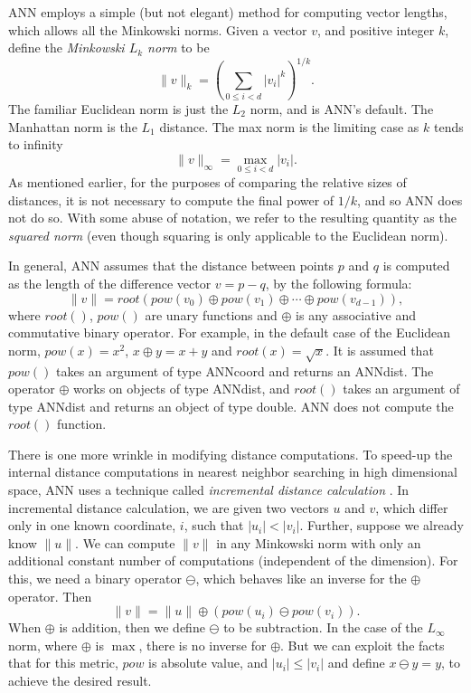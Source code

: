 \documentclass[11pt]{article}		%
\newcommand{\ANN}[0]{\textsf{ANN}}
\newcommand{\ROOT}[0]{\textit{root}}
\newcommand{\POW}[0]{\textit{pow}}
\newcommand{\DIFF}[0]{\ominus}
\newcommand{\SUM}[0]{\oplus}
\begin{document}
{\ANN} employs a simple (but not elegant) method for computing vector
lengths, which allows all the Minkowski norms.  Given a vector $v$, and
positive integer $k$, define the \emph{Minkowski $L_k$ norm} to be
\[
	\|v\|_k = \left( \sum_{0 \le i < d} |v_i|^k \right)^{1/k}.
\]
The familiar Euclidean norm is just the $L_2$ norm, and is {\ANN}'s
default.  The Manhattan norm is the $L_1$ distance.  The max norm is the
limiting case as $k$ tends to infinity
\[
	\|v\|_{\infty} = \max_{0 \le i < d} | v_i |.
\]
As mentioned earlier, for the purposes of comparing the relative sizes
of distances, it is not necessary to compute the final power of $1/k$,
and so {\ANN} does not do so.  With some abuse of notation, we refer to
the resulting quantity as the \emph{squared norm} (even though squaring
is only applicable to the Euclidean norm).

In general, {\ANN} assumes that the distance between points $p$ and $q$
is computed as the length of the difference vector $v = p - q$, by the
following formula:
\[
	\|v\| = \ROOT(\POW(v_0) \SUM \POW(v_1) \SUM \cdots \SUM \POW(v_{d-1})),
\]
where $\ROOT()$, $\POW()$ are unary functions and $\SUM$ is any
associative and commutative binary operator.  For example, in the
default case of the Euclidean norm, $\POW(x) = x^2$, $x \SUM y  = x + y$
and $\ROOT(x) = \sqrt{x}$.  It is assumed that $\POW()$ takes an
argument of type \textsf{ANNcoord} and returns an \textsf{ANNdist}.  The
operator $\SUM$ works on objects of type \textsf{ANNdist}, and $\ROOT()$
takes an argument of type \textsf{ANNdist} and returns an object of type
\textsf{double}.  {\ANN} does not compute the $\ROOT()$ function.

There is one more wrinkle in modifying distance computations.  To
speed-up the internal distance computations in nearest neighbor
searching in high dimensional space, {\ANN} uses a technique called
\emph{incremental distance calculation} \cite{ArM93b}.  In incremental
distance calculation, we are given two vectors $u$ and $v$, which differ
only in one known coordinate, $i$, such that $|u_i| < |v_i|$.  Further,
suppose we already know $\|u\|$.  We can compute $\|v\|$ in any
Minkowski norm with only an additional constant number of computations
(independent of the dimension).  For this, we need a binary operator
$\DIFF$, which behaves like an inverse for the $\SUM$ operator.  Then
\[
	\|v\| = \|u\| \SUM (\POW(u_i) \DIFF \POW(v_i)).
\]
When $\SUM$ is addition, then we define $\DIFF$ to be subtraction.  In
the case of the $L_{\infty}$ norm, where $\SUM$ is $\max$, there is no
inverse for $\SUM$.  But we can exploit the facts that for this metric,
$\POW$ is absolute value, and $|u_i| \le |v_i|$ and define $x \DIFF y =
y$, to achieve the desired result.
\end{document}
